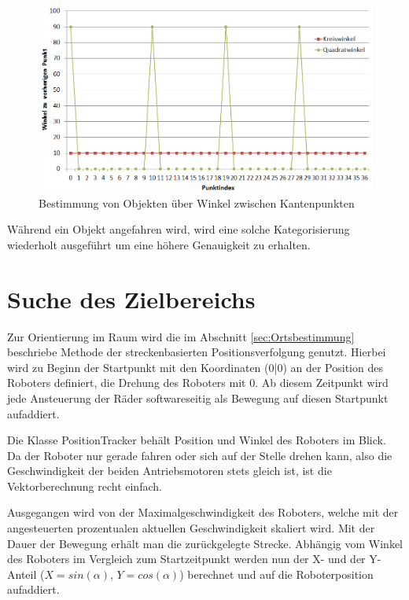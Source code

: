 \begin{figure}[h]
\centering
\includegraphics[width=\textwidth]{Bilder/Workloop/KreisQuadratWinkel}
\caption{Bestimmung von Objekten über Winkel zwischen Kantenpunkten}
\label{fig:KreisQuadratWinkel}
\end{figure}

Während ein Objekt angefahren wird, wird eine solche Kategorisierung wiederholt ausgeführt um eine höhere Genauigkeit zu erhalten.

\section{Suche des Zielbereichs}
\label{sec:Orientierung}

Zur Orientierung im Raum wird die im Abschnitt \ref{sec:Ortsbestimmung} beschriebe Methode der streckenbasierten Positionsverfolgung genutzt. Hierbei wird zu Beginn der Startpunkt mit den Koordinaten (0|0) an der Position des Roboters definiert, die Drehung des Roboters mit 0\degree. Ab diesem Zeitpunkt wird jede Ansteuerung der Räder  softwareseitig als Bewegung auf diesen Startpunkt aufaddiert. 

Die Klasse PositionTracker behält Position und Winkel des Roboters im Blick. Da der Roboter nur gerade fahren oder sich auf der Stelle drehen kann, also die Geschwindigkeit der beiden Antriebsmotoren stets gleich ist, ist die Vektorberechnung recht einfach.

Ausgegangen wird von der Maximalgeschwindigkeit des Roboters, welche mit der angesteuerten prozentualen aktuellen Geschwindigkeit skaliert wird. Mit der Dauer der Bewegung erhält man die zurückgelegte Strecke. Abhängig vom Winkel des Roboters im Vergleich zum Startzeitpunkt werden nun der X- und der Y-Anteil ($X=sin(\alpha)$, $Y=cos(\alpha)$) berechnet und auf die Roboterposition aufaddiert.

